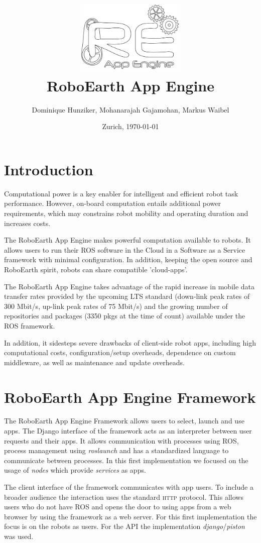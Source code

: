\documentclass[10pt,a4paper]{article}
\title {\includegraphics[height=1.40in]{icon.pdf} \\RoboEarth App Engine }
\author {Dominique Hunziker, Mohanarajah Gajamohan, Markus Waibel}
\date{Zurich, \today}
\begin{document}
\maketitle
\section*{Introduction}

		Computational power is a key enabler for 
		intelligent and efficient robot task performance. However, on-board
		computation entails additional power requirements, which may constrains robot mobility and operating duration and increases costs.

The RoboEarth App Engine makes powerful computation available to robots. 
It allows users to run their ROS software in the Cloud in a Software as a Service framework with minimal configuration.
In addition,
		keeping the open source and RoboEarth spirit, robots can share compatible 'cloud-apps'.

The RoboEarth App Engine takes advantage of the rapid increase in mobile data transfer rates provided
		by the upcoming LTS standard (down-link peak rates of 300 Mbit/s,
		up-link peak rates of 75 Mbit/s) and the growing number of
		repositories and packages (3350 pkgs at the time of count) available
		under the ROS framework. 
				
In addition, it sidesteps severe drawbacks of client-side robot apps, including high computational costs, 
configuration/setup overheads, dependence on custom middleware, as well as maintenance and update overheads. 
		
	
	\section*{RoboEarth App Engine Framework}
		The RoboEarth App Engine Framework allows users to select, launch and use apps.
		The Django interface of the framework acts as an interpreter between user
		requests and their apps. It allows 
communication with processes using \textsc{ROS}, process management
		using \emph{roslaunch} and has a standardized language to communicate between
		processes. In this first implementation we focused on the usage of \emph{nodes} which provide
		\emph{services} as apps.
		
		The client interface of the framework communicates with app users. 
To include a broader audience the interaction uses the standard \textsc{http} protocol.
		This allows users who do not have \textsc{ROS} and opens the door to using apps from
		a web browser by using the framework as a web server. For this first
		implementation the focus is on the robots as users. For the API 
		the implementation \emph{django}/\emph{piston} was used.
	
\end{document}
